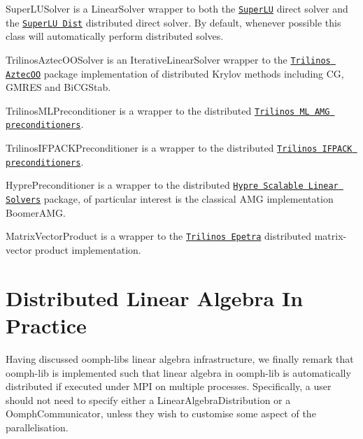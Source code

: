 \begin{DoxyItemize}
\item {\ttfamily Super\+L\+U\+Solver} is a {\ttfamily Linear\+Solver} wrapper to both the \href{http://crd.lbl.gov/~xiaoye/SuperLU/#superlu}{\tt {\ttfamily Super\+LU}} direct solver and the \href{http://crd.lbl.gov/~xiaoye/SuperLU/#superlu_dist}{\tt {\ttfamily Super\+LU Dist}} distributed direct solver. By default, whenever possible this class will automatically perform distributed solves.
\item {\ttfamily Trilinos\+Aztec\+O\+O\+Solver} is an {\ttfamily Iterative\+Linear\+Solver} wrapper to the \href{http://trilinos.sandia.gov/packages/aztecoo}{\tt {\ttfamily Trilinos Aztec\+OO}} package implementation of distributed Krylov methods including CG, G\+M\+R\+ES and Bi\+C\+G\+Stab.
\item {\ttfamily Trilinos\+M\+L\+Preconditioner} is a wrapper to the distributed \href{http://trilinos.sandia.gov/packages/ml}{\tt Trilinos ML A\+MG preconditioners}.
\item {\ttfamily Trilinos\+I\+F\+P\+A\+C\+K\+Preconditioner} is a wrapper to the distributed \href{http://trilinos.sandia.gov/packages/ifpack}{\tt Trilinos I\+F\+P\+A\+CK preconditioners}.
\item {\ttfamily Hypre\+Preconditioner} is a wrapper to the distributed \href{https://computation.llnl.gov/casc/linear_solvers/sls_hypre.html}{\tt {\ttfamily Hypre Scalable Linear Solvers}} package, of particular interest is the classical A\+MG implementation {\ttfamily Boomer\+A\+MG}.
\item {\ttfamily Matrix\+Vector\+Product} is a wrapper to the \href{http://trilinos.sandia.gov/packages/epetra/}{\tt {\ttfamily Trilinos Epetra}} distributed matrix-\/vector product implementation.
\end{DoxyItemize}\hypertarget{index_distributed_linear_algebra_in_practice}{}\section{Distributed Linear Algebra In Practice}\label{index_distributed_linear_algebra_in_practice}
Having discussed {\ttfamily oomph-\/lib\textquotesingle{}s} linear algebra infrastructure, we finally remark that {\ttfamily oomph-\/lib} is implemented such that linear algebra in {\ttfamily oomph-\/lib} is automatically distributed if executed under M\+PI on multiple processes. Specifically, a user should not need to specify either a {\ttfamily Linear\+Algebra\+Distribution} or a {\ttfamily Oomph\+Communicator}, unless they wish to customise some aspect of the parallelisation.


